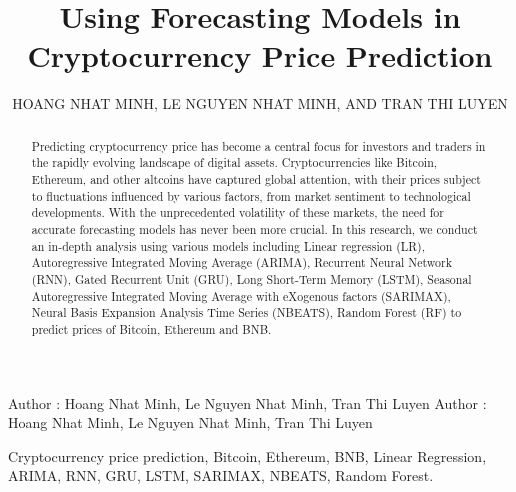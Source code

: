 \documentclass{ieeeojies}
\begin{document}
\title{Using Forecasting Models in Cryptocurrency Price Prediction}

\author{\uppercase{Hoang Nhat Minh},
\uppercase{Le Nguyen Nhat Minh, and Tran Thi Luyen}}

\address[1]{Faculty of Information Systems, University of Information Technology, (e-mail: 21522336@gm.uit.edu.vn)}
\address[2]{Faculty of Information Systems, University of Information Technology, (e-mail: 21522338@gm.uit.edu.vn)}
\address[3]{Faculty of Information Systems, University of Information Technology, (e-mail: 21521107@gm.uit.edu.vn)}

\markboth
{Author \headeretal: Hoang Nhat Minh, Le Nguyen Nhat Minh, Tran Thi Luyen}
{Author \headeretal: Hoang Nhat Minh, Le Nguyen Nhat Minh, Tran Thi Luyen}

\begin{abstract}
Predicting cryptocurrency price has become a central focus for investors and traders in the rapidly evolving landscape of digital assets. Cryptocurrencies like Bitcoin, Ethereum, and other altcoins have captured global attention, with their prices subject to fluctuations influenced by various factors, from market sentiment to technological developments. With the unprecedented volatility of these markets, the need for accurate forecasting models has never been more crucial. In this research, we conduct an in-depth analysis using various models including Linear regression (LR), Autoregressive Integrated Moving Average (ARIMA), Recurrent Neural Network (RNN), Gated Recurrent Unit (GRU), Long Short-Term Memory (LSTM), Seasonal Autoregressive Integrated Moving Average with eXogenous factors (SARIMAX), Neural Basis Expansion Analysis Time Series (NBEATS), Random Forest (RF) to predict prices of Bitcoin, Ethereum and BNB.
\end{abstract}

\begin{keywords}
Cryptocurrency price prediction, Bitcoin, Ethereum, BNB, Linear Regression, ARIMA, RNN, GRU, LSTM, SARIMAX, NBEATS, Random Forest.
\end{keywords}

\titlepgskip=-15pt

\maketitle
\end{document}

